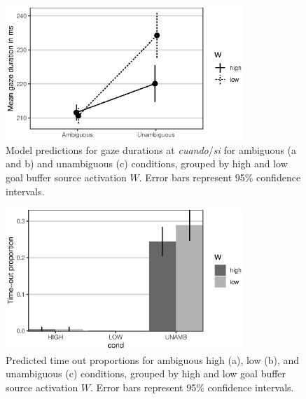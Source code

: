 \documentclass{cambridge7A}\usepackage[]{graphicx}\usepackage[]{color}
\newenvironment{knitrout}{}{} %
\begin{document}
\begin{figure}[!htbp]
\centering
\begin{knitrout}
\color{fgcolor}

{\centering \includegraphics[width=0.8\textwidth]{figures/fig-mv13modelambadv-1} 

}



\end{knitrout}
  \caption[Predicted gaze durations by source activation at ambiguous and unambiguous attachments.]{Model predictions for gaze durations at \textit{cuando}/\textit{si} for ambiguous (a and b) and unambiguous (c) conditions, grouped by high and low goal buffer source activation $W$. Error bars represent 95\% confidence intervals.} \label{fig:mv13model:rt}
\end{figure}


\begin{figure}[!htbp]
  \centering
\begin{knitrout}
\color{fgcolor}

{\centering \includegraphics[width=0.8\textwidth]{figures/fig-mv13modeltimeout-1} 

}



\end{knitrout}
  \caption[Predicted time out proportions by source activation at ambiguous and unambiguous attachments.]{Predicted time out proportions for ambiguous high (a), low (b), and unambiguous (c) conditions, grouped by high and low goal buffer source activation $W$. Error bars represent 95\% confidence intervals.} \label{fig:mv13model:timeout}
\end{figure}
\end{document}
